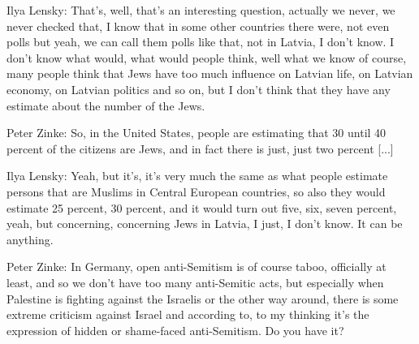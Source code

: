 Ilya Lensky: That’s, well, that’s an interesting question, actually we never, we never checked that, I know that in some other countries  there were, not even polls but yeah, we can call them polls like that, not in Latvia, I don’t know. I don’t know what would, what would people think, well what we know of course, many people think that Jews have too much influence on Latvian life, on Latvian economy, on Latvian politics and so on, but I don’t think that they have any estimate about the number of the Jews. 

Peter Zinke: So, in the United States, people are estimating that 30 until 40 percent of the citizens are Jews, and in fact there is just, just two percent [...] 

Ilya Lensky: Yeah, but it’s, it’s very much the same as what people estimate persons that are Muslims in Central European countries, so also they would estimate 25 percent, 30 percent, and it would turn out five, six, seven percent, yeah, but concerning, concerning Jews in Latvia, I just, I don’t know. It can be anything. 

Peter Zinke: In Germany, open anti-Semitism is of course taboo, officially at least, and so we don’t have too many anti-Semitic acts, but especially when Palestine is fighting against the Israelis or the other way around, there is some extreme criticism against Israel and according to, to my thinking it’s the expression of hidden or shame-faced anti-Semitism. Do you have it?

